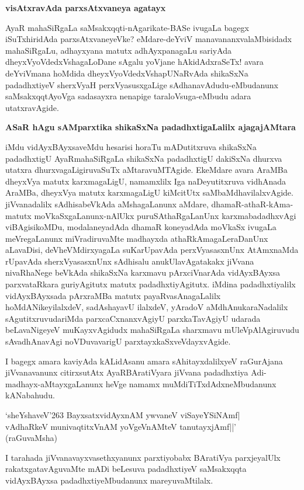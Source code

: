 \textbf{visAtxravAda parxsAtxvaneya agatayx}

AyaR mahaSiRgaLa saMsakxqqti-nAgarikate-BASe ivugaLa bagegx iSuTxhiridAda parxsAtxvaneyeVke? eMdare-deYviV manavananxvalaMbisidadx mahaSiRgaLu, adhayxyana matutx adhAyxpanagaLu sariyAda dheyxVyoVdedxVshagaLoDane sAgalu yoVjane hAkidAdxraSeTx! avara deYviVmana hoMdida dheyxVyoVdedxVshapUNaRvAda shikaSxNa padadhxtiyeV sherxVyaH perxVyasusxgaLige sAdhanavAdudu-eMbudanunx saMsakxqqtAyoVga sadasayxra nenapige taraloVsuga-eMbudu adara utatxravAgide.

\textbf{ASaR hAgu sAMparxtika shikaSxNa padadhxtigaLalilx ajagajAMtara}

iMdu vidAyxBAyxsaveMdu hesarisi horaTu mADutitxruva shikaSxNa padadhxtigU AyaRmahaSiRgaLa shikaSxNa padadhxtigU dakiSxNa dhurxva utatxra dhurxvagaLigiruvaSuTx aMtaravuMTAgide. EkeMdare avara AraMBa dheyxVya matutx karxmagaLigU, namamxlilx Iga naDeyutitxruva vidhAnada AraMBa, dheyxVya matutx karxmagaLigU kiMcitUtx saMbaMdhavilalxvAgide. jiVvanadalilx sAdhisabeVkAda aMshagaLanunx aMdare, dhamaR-athaR-kAma-matutx moVkaSxgaLanunx-nAlUkx puruSAthaRgaLanUnx karxmabadadhxvAgi viBAgisikoMDu, modalaneyadAda dhamaR koneyadAda moVkaSx ivugaLa meVregaLanunx miVradiruvaMte madhayxda athaRkAmagaLeraDanUnx aLavaDisi, deVheVMdirxyagaLa suKarUpavAda perxVyasasxnUnx AtAmxnaMda rUpavAda sherxVyasasxnUnx sAdhisalu anukUlavAgatakakx jiVvana nivaRhaNege beVkAda shikaSxNa karxmavu pArxciVnarAda vidAyxBAyxsa parxvataRkara guriyAgitutx matutx padadhxtiyAgitutx. iMdina padadhxtiyalilx vidAyxBAyxsada pArxraMBa matutx payaRvasAnagaLalilx hoMdANikeyilalxdeV, sadAshayavU ilalxdeV, yAradoV aMdhAnukaraNadalilx sAgutitxruvudariMda parxcaCxnanxvAgiyU parxkaTavAgiyU udarada beLavaNigeyeV muKayxvAgidudx mahaSiRgaLa sharxmavu mUleVpAlAgiruvudu sAvadhAnavAgi noVDuvavarigU parxtayxkaSxveVdayxvAgide.

I bagegx amara kaviyAda kALidAsanu amara sAhitayxdalilxyeV raGurAjana jiVvanavanunx citirxsutAtx AyaRBAratiVyara jiVvana padadhxtiya Adi-madhayx-aMtayxgaLanunx heVge namamx muMdiTiTxdAdxneMbudanunx kANabahudu.

\begin{shloka}
`sheYshaveV\char'263 BayxsatxvidAyxnAM ywvaneV viSayeYSiNAmf|\\
vAdhaRkeV munivaqtitxVnAM yoVgeVnAMteV tanutayxjAmf||'\\
\hfill (raGuvaMsha)
\end{shloka}

I tarahada jiVvanavayxvasethxyanunx parxtiyobabx BAratiVya parxjeyalUlx rakatxgatavAguvaMte mADi beLesuva padadhxtiyeV saMsakxqqta vidAyxBAyxsa padadhxtiyeMbudanunx mareyuvaMtilalx.


